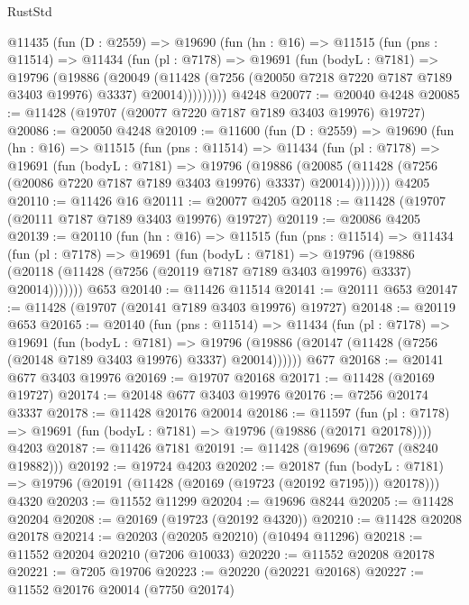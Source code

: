 \begin{lexlean}{RustStd}
\begin{coremodule}
    @11435
      (fun (D : @2559) =>
      @19690
        (fun (hn : @16) =>
        @11515
          (fun (pns : @11514) =>
          @11434
            (fun (pl : @7178) =>
            @19691
              (fun (bodyL : @7181) =>
              @19796
                (@19886
                  (@20049
                    (@11428
                      (@7256 (@20050 @7218 @7220 @7187 @7189 @3403 @19976) @3337)
                      @20014)))))))))
    @4248
@20077 := @20040 @4248
@20085 := @11428 (@19707 (@20077 @7220 @7187 @7189 @3403 @19976) @19727)
@20086 := @20050 @4248
@20109 := @11600
    (fun (D : @2559) =>
    @19690
      (fun (hn : @16) =>
      @11515
        (fun (pns : @11514) =>
        @11434
          (fun (pl : @7178) =>
          @19691
            (fun (bodyL : @7181) =>
            @19796
              (@19886
                (@20085 (@11428 (@7256 (@20086 @7220 @7187 @7189 @3403 @19976) @3337) @20014))))))))
    @4205
@20110 := @11426 @16
@20111 := @20077 @4205
@20118 := @11428 (@19707 (@20111 @7187 @7189 @3403 @19976) @19727)
@20119 := @20086 @4205
@20139 := @20110
    (fun (hn : @16) =>
    @11515
      (fun (pns : @11514) =>
      @11434
        (fun (pl : @7178) =>
        @19691
          (fun (bodyL : @7181) =>
          @19796
            (@19886 (@20118 (@11428 (@7256 (@20119 @7187 @7189 @3403 @19976) @3337) @20014)))))))
    @653
@20140 := @11426 @11514
@20141 := @20111 @653
@20147 := @11428 (@19707 (@20141 @7189 @3403 @19976) @19727)
@20148 := @20119 @653
@20165 := @20140
    (fun (pns : @11514) =>
    @11434
      (fun (pl : @7178) =>
      @19691
        (fun (bodyL : @7181) =>
        @19796 (@19886 (@20147 (@11428 (@7256 (@20148 @7189 @3403 @19976) @3337) @20014))))))
    @677
@20168 := @20141 @677 @3403 @19976
@20169 := @19707 @20168
@20171 := @11428 (@20169 @19727)
@20174 := @20148 @677 @3403 @19976
@20176 := @7256 @20174 @3337
@20178 := @11428 @20176 @20014
@20186 := @11597
    (fun (pl : @7178) => @19691 (fun (bodyL : @7181) => @19796 (@19886 (@20171 @20178))))
    @4203
@20187 := @11426 @7181
@20191 := @11428 (@19696 (@7267 (@8240 @19882)))
@20192 := @19724 @4203
@20202 := @20187
    (fun (bodyL : @7181) => @19796 (@20191 (@11428 (@20169 (@19723 (@20192 @7195))) @20178)))
    @4320
@20203 := @11552 @11299
@20204 := @19696 @8244
@20205 := @11428 @20204
@20208 := @20169 (@19723 (@20192 @4320))
@20210 := @11428 @20208 @20178
@20214 := @20203 (@20205 @20210) (@10494 @11296)
@20218 := @11552 @20204 @20210 (@7206 @10033)
@20220 := @11552 @20208 @20178
@20221 := @7205 @19706
@20223 := @20220 (@20221 @20168)
@20227 := @11552 @20176 @20014 (@7750 @20174)

\end{coremodule}
\end{lexlean}
